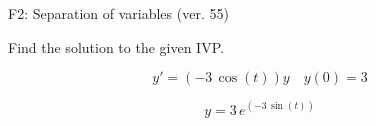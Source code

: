 \begin{exercise}
  \begin{exerciseTitle}F2: Separation of variables (ver. 55)\end{exerciseTitle}
  \begin{exerciseStatement}
    
Find the solution to the given IVP.

    
\[y'=( -3 \, \cos\left(t\right) )y\hspace{1em} y(0)= 3\]

  \end{exerciseStatement}
  \begin{exerciseAnswer}
    
\[y= 3 \, e^{\left(-3 \, \sin\left(t\right)\right)}\]

  \end{exerciseAnswer}
\end{exercise}